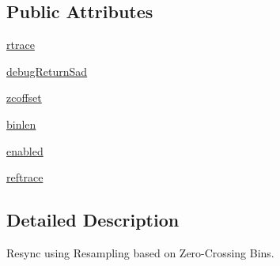 \subsection*{Public Attributes}
\begin{DoxyCompactItemize}
\item 
\hyperlink{classsoftware_1_1chipwhisperer_1_1analyzer_1_1preprocessing_1_1ResyncResampleZC_1_1ResyncResampleZC_aff2f7326db7dd0e654700cbcb8b9e754}{rtrace}
\item 
\hyperlink{classsoftware_1_1chipwhisperer_1_1analyzer_1_1preprocessing_1_1ResyncResampleZC_1_1ResyncResampleZC_a8db7d2210c96f7b6c1937646430a6dc2}{debug\+Return\+Sad}
\item 
\hyperlink{classsoftware_1_1chipwhisperer_1_1analyzer_1_1preprocessing_1_1ResyncResampleZC_1_1ResyncResampleZC_aafac1084581095b34dfb9b7ac44be9e7}{zcoffset}
\item 
\hyperlink{classsoftware_1_1chipwhisperer_1_1analyzer_1_1preprocessing_1_1ResyncResampleZC_1_1ResyncResampleZC_a5147235d63b16a6dc683772915685d3d}{binlen}
\item 
\hyperlink{classsoftware_1_1chipwhisperer_1_1analyzer_1_1preprocessing_1_1ResyncResampleZC_1_1ResyncResampleZC_a5707ced1e15cf27add9e9a5e2653db1d}{enabled}
\item 
\hyperlink{classsoftware_1_1chipwhisperer_1_1analyzer_1_1preprocessing_1_1ResyncResampleZC_1_1ResyncResampleZC_a8f5b6a1f4802e6dc958b29426d5addf9}{reftrace}
\end{DoxyCompactItemize}


\subsection{Detailed Description}
\begin{DoxyVerb}Resync using Resampling based on Zero-Crossing Bins.
\end{DoxyVerb}
 

